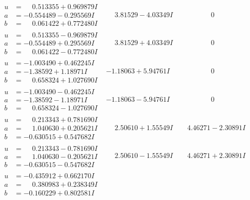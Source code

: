 \documentclass[1p]{elsarticle_modified}
\theoremstyle{definition}
\begin{document}
$$\begin{array}{c|c|c}
\begin{aligned}
u &= \phantom{-}0.513355 + 0.969879 I \\
a &= -0.554489 - 0.295569 I \\
b &= \phantom{-}0.061422 + 0.772480 I\end{aligned}
 & \phantom{-}3.81529 - 4.03349 I & \phantom{-0.000000 } 0 \\ \hline\begin{aligned}
u &= \phantom{-}0.513355 - 0.969879 I \\
a &= -0.554489 + 0.295569 I \\
b &= \phantom{-}0.061422 - 0.772480 I\end{aligned}
 & \phantom{-}3.81529 + 4.03349 I & \phantom{-0.000000 } 0 \\ \hline\begin{aligned}
u &= -1.003490 + 0.462245 I \\
a &= -1.38592 + 1.18971 I \\
b &= \phantom{-}0.658324 + 1.027690 I\end{aligned}
 & -1.18063 + 5.94761 I & \phantom{-0.000000 } 0 \\ \hline\begin{aligned}
u &= -1.003490 - 0.462245 I \\
a &= -1.38592 - 1.18971 I \\
b &= \phantom{-}0.658324 - 1.027690 I\end{aligned}
 & -1.18063 - 5.94761 I & \phantom{-0.000000 } 0 \\ \hline\begin{aligned}
u &= \phantom{-}0.213343 + 0.781690 I \\
a &= \phantom{-}1.040630 + 0.205621 I \\
b &= -0.630515 + 0.547682 I\end{aligned}
 & \phantom{-}2.50610 + 1.55549 I & \phantom{-}4.46271 - 2.30891 I \\ \hline\begin{aligned}
u &= \phantom{-}0.213343 - 0.781690 I \\
a &= \phantom{-}1.040630 - 0.205621 I \\
b &= -0.630515 - 0.547682 I\end{aligned}
 & \phantom{-}2.50610 - 1.55549 I & \phantom{-}4.46271 + 2.30891 I \\ \hline\begin{aligned}
u &= -0.435912 + 0.662170 I \\
a &= \phantom{-}0.380983 + 0.238349 I \\
b &= -0.160229 + 0.802581 I\end{aligned}

\end{array}$$
\end{document}
